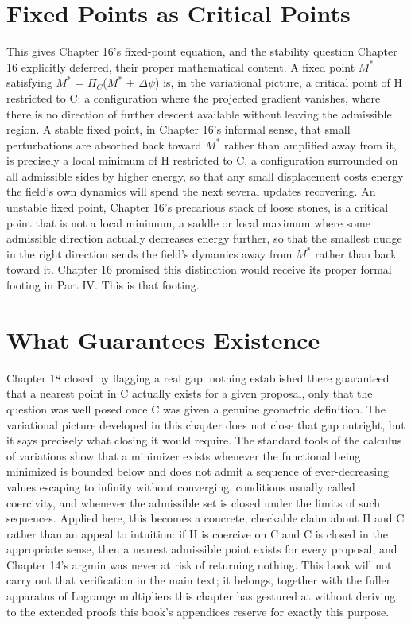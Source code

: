 \section{Fixed Points as Critical Points}

This gives Chapter 16's fixed-point equation, and the stability question Chapter 16 explicitly deferred, their proper mathematical content. A fixed point \(M^*\) satisfying \(M^*\) = \(\Pi_C\)(\(M^*\) + \(\Delta\psi\)) is, in the variational picture, a critical point of H restricted to C: a configuration where the projected gradient vanishes, where there is no direction of further descent available without leaving the admissible region. A stable fixed point, in Chapter 16's informal sense, that small perturbations are absorbed back toward \(M^*\) rather than amplified away from it, is precisely a local minimum of H restricted to C, a configuration surrounded on all admissible sides by higher energy, so that any small displacement costs energy the field's own dynamics will spend the next several updates recovering. An unstable fixed point, Chapter 16's precarious stack of loose stones, is a critical point that is not a local minimum, a saddle or local maximum where some admissible direction actually decreases energy further, so that the smallest nudge in the right direction sends the field's dynamics away from \(M^*\) rather than back toward it. Chapter 16 promised this distinction would receive its proper formal footing in Part IV. This is that footing.

\section{What Guarantees Existence}

Chapter 18 closed by flagging a real gap: nothing established there guaranteed that a nearest point in C actually exists for a given proposal, only that the question was well posed once C was given a genuine geometric definition. The variational picture developed in this chapter does not close that gap outright, but it says precisely what closing it would require. The standard tools of the calculus of variations show that a minimizer exists whenever the functional being minimized is bounded below and does not admit a sequence of ever-decreasing values escaping to infinity without converging, conditions usually called coercivity, and whenever the admissible set is closed under the limits of such sequences. Applied here, this becomes a concrete, checkable claim about H and C rather than an appeal to intuition: if H is coercive on C and C is closed in the appropriate sense, then a nearest admissible point exists for every proposal, and Chapter 14's argmin was never at risk of returning nothing. This book will not carry out that verification in the main text; it belongs, together with the fuller apparatus of Lagrange multipliers this chapter has gestured at without deriving, to the extended proofs this book's appendices reserve for exactly this purpose.

